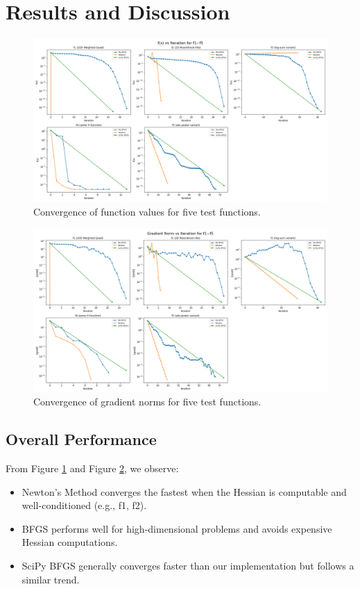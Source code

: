 \documentclass[a4paper,12pt]{article}
\begin{document}
\section{Results and Discussion}


\begin{figure}[htbp]
    \centering
    \includegraphics[width=0.82\linewidth]{pics/comparison_f_values.png}
    \caption{Convergence of function values for five test functions.}
    \label{fig:comparison-f}
\end{figure}
\begin{figure}[htbp]
    \centering
    \includegraphics[width=0.82\linewidth]{pics/comparison_grad_norms.png}
    \caption{Convergence of gradient norms for five test functions.}
    \label{fig:comparison-grad}
\end{figure}
\subsection{Overall Performance}
From Figure \ref{fig:comparison-f} and Figure \ref{fig:comparison-grad}, we observe:
\begin{itemize}
    \item Newton's Method converges the fastest when the Hessian is computable and well-conditioned (e.g., f1, f2).
    \item BFGS performs well for high-dimensional problems and avoids expensive Hessian computations.
    \item SciPy BFGS generally converges faster than our implementation but follows a similar trend.
\end{itemize}
\end{document}
